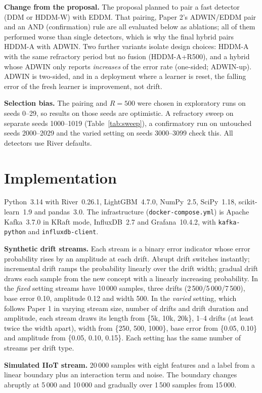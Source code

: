 \documentclass[conference]{IEEEtran}
\begin{document}
\textbf{Change from the proposal.} The proposal planned to pair a fast detector (DDM or HDDM-W) with EDDM. That pairing, Paper 2's ADWIN/EDDM pair and an AND (confirmation) rule are all evaluated below as ablations; all of them performed worse than single detectors, which is why the final hybrid pairs HDDM-A with ADWIN. Two further variants isolate design choices: HDDM-A with the same refractory period but no fusion (HDDM-A+R500), and a hybrid whose ADWIN only reports \emph{increases} of the error rate (one-sided; ADWIN-up). ADWIN is two-sided, and in a deployment where a learner is reset, the falling error of the fresh learner is improvement, not drift.

\textbf{Selection bias.} The pairing and $R=500$ were chosen in exploratory runs on seeds 0--29, so results on those seeds are optimistic. A refractory sweep on separate seeds 1000--1019 (Table~\ref{tab:sweep}), a confirmatory run on untouched seeds 2000--2029 and the varied setting on seeds 3000--3099 check this. All detectors use River defaults.

\section{Implementation}
Python~3.14 with River~0.26.1, LightGBM~4.7.0, NumPy~2.5, SciPy~1.18, scikit-learn~1.9 and pandas~3.0. The infrastructure (\texttt{docker-compose.yml}) is Apache Kafka~3.7.0 in KRaft mode, InfluxDB~2.7 and Grafana~10.4.2, with \texttt{kafka-python} and \texttt{influxdb-client}.

\textbf{Synthetic drift streams.} Each stream is a binary error indicator whose error probability rises by an amplitude at each drift. Abrupt drift switches instantly; incremental drift ramps the probability linearly over the drift width; gradual drift draws each sample from the new concept with a linearly increasing probability. In the \emph{fixed} setting streams have 10\,000 samples, three drifts (2\,500/5\,000/7\,500), base error 0.10, amplitude 0.12 and width 500. In the \emph{varied} setting, which follows Paper 1 in varying stream size, number of drifts and drift duration and amplitude, each stream draws its length from \{5k, 10k, 20k\}, 1--4 drifts (at least twice the width apart), width from \{250, 500, 1000\}, base error from \{0.05, 0.10\} and amplitude from \{0.05, 0.10, 0.15\}. Each setting has the same number of streams per drift type.

\textbf{Simulated IIoT stream.} 20\,000 samples with eight features and a label from a linear boundary plus an interaction term and noise. The boundary changes abruptly at 5\,000 and 10\,000 and gradually over 1\,500 samples from 15\,000.
\end{document}
